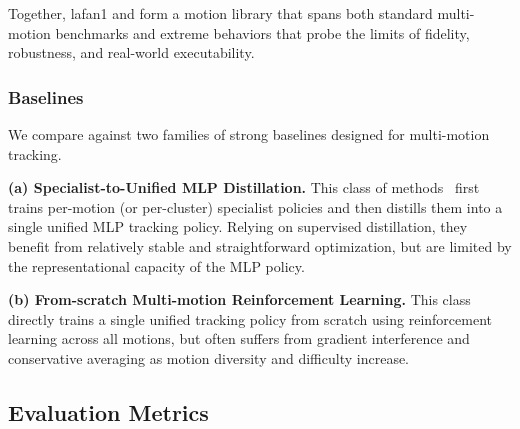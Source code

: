 Together, \ac{lafan1} and \dataset form a motion library that spans both standard
multi-motion benchmarks and extreme behaviors that probe the limits of fidelity,
robustness, and real-world executability.

\subsubsection{Baselines}
We compare against two families of strong baselines designed for multi-motion tracking.

\noindent\textbf{(a) Specialist-to-Unified MLP Distillation.}
This class of methods~\cite{zhang2025track} first trains per-motion
(or per-cluster) specialist policies and then distills them into a single unified MLP
tracking policy. Relying on supervised distillation, they benefit from relatively stable and
straightforward optimization, but are limited by the representational
capacity of the MLP policy.

\noindent\textbf{(b) From-scratch Multi-motion Reinforcement Learning.}
This class~\cite{he2024omnih2o,chen2025gmt,ji2024exbody2,zhang2025track,luo2025sonic,liao2025beyondmimic} directly trains a single unified tracking policy from scratch using reinforcement learning across all motions, but often suffers from gradient interference and conservative averaging as motion diversity and difficulty increase.




\subsection{Evaluation Metrics}

